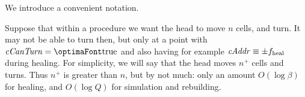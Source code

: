 \documentclass[12pt]{memoir}
\newcommand{\fld}[1]{\ensuremath{\textit{#1\/}}}
\newcommand{\tEnd}{f_{\mathrm{end}}}
\newcommand{\tHeal}{f_{\mathrm{heal}}}
\def\B{B}
\newcommand{\E}{E}
\newcommand{\Z}{Z}
\newcommand{\cAddr}{\fld{cAddr}}
\newcommand{\cCanTurn}{\fld{cCanTurn}}
\newcommand{\PadLen}{\mathit{PadLen}}
\begin{document}
\begin{description}

\end{description}





We introduce a convenient notation.
\begin{notation}\label{not:plus}
Suppose that within a procedure we want the head to move \( n \) cells, and turn.
It may not be able to turn then, but only at a point with \( \cCanTurn=\true \) and
also having  for example \( \cAddr\equiv\pm\tHeal \) during healing.
For simplicity, we will say that the head moves \( n^{+} \) cells and turns.
Thus \( n^{+} \) is greater than \( n \), but by not much: only an amount \( O(\log\beta) \) for healing,
and \( O(\log Q) \) for simulation and rebuilding.
\end{notation}
\end{document}
